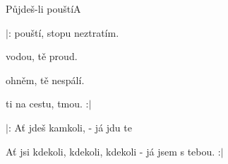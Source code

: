 \pagebreak
\setcounter{page}{116}
\begin{song}{Půjdeš-li pouští}{A}{}
\begin{SBChorus*}

$|$:  pouští,  stopu neztratím.

 vodou,  tě proud.

 ohněm,  tě nespálí.

 ti na cestu,  tmou. :$|$

$|$: Ať jdeš  kamkoli,  - já jdu te

Ať jsi kdekoli, kdekoli, kdekoli - já jsem s tebou. :$|$

\end{SBChorus*}
\end{song}

